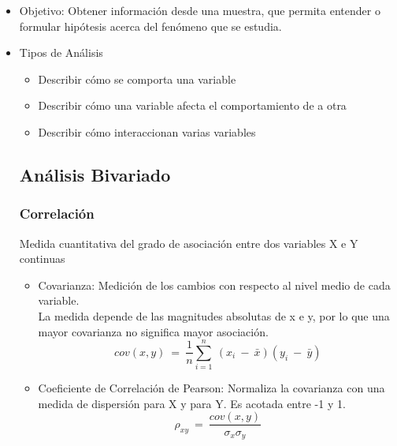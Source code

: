 \begin{itemize}
	\item Objetivo: Obtener informaci\'on desde una muestra, que permita entender o formular hip\'otesis acerca del fen\'omeno que se estudia.
	\item Tipos de An\'alisis
	\begin{itemize}
		\item Describir c\'omo se comporta una variable
		\item Describir c\'omo una variable afecta el comportamiento de a otra
		\item Describir c\'omo interaccionan varias variables
	\end{itemize}
	\subsection{An\'alisis Bivariado}
		\subsubsection{Correlaci\'on}
		Medida cuantitativa del grado de asociaci\'on entre dos variables X e Y continuas
		\begin{itemize}
			\item Covarianza: Medici\'on de los cambios con respecto al nivel medio de cada variable.\\
					 La medida depende de las magnitudes absolutas de x e y, por lo que una mayor covarianza no significa mayor asociaci\'on.\\
					 $$ cov(x,y)\ =\ \frac{1}{n}\sum_{i=1}^{n}\ (x_i\ -\ \bar{x})(y_i\ -\ \bar{y}) $$
			\item Coeficiente de Correlaci\'on de Pearson: Normaliza la covarianza con una medida de dispersi\'on para X y para Y. Es acotada entre -1 y 1.
					 $$\rho_{xy}\ =\ \frac{cov(x,y)}{\sigma_x\sigma_y}$$



\end{itemize}
\end{itemize}

